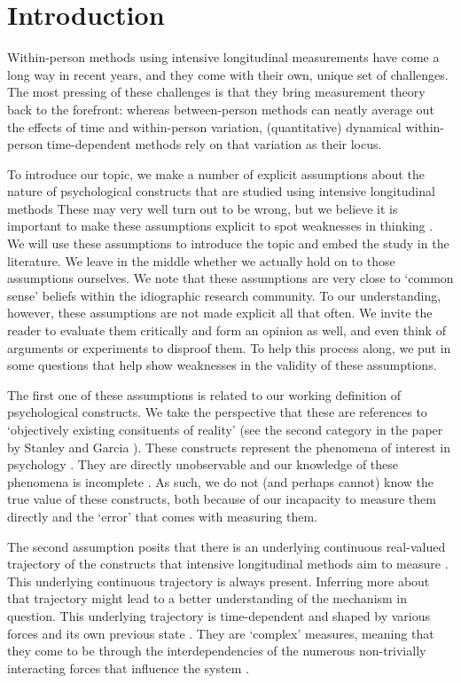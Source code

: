 \documentclass[utf8]{FrontiersinVancouver}
\begin{document}
\section{Introduction}

Within-person methods using intensive longitudinal measurements have come a long way in recent years, and they come with their own, unique set of challenges. The most pressing of these challenges is that they bring measurement theory back to the forefront: whereas between-person methods can neatly average out the effects of time and within-person variation, (quantitative) dynamical within-person time-dependent methods rely on that variation as their locus. 

To introduce our topic, we make a number of explicit assumptions about the nature of psychological constructs that are studied using intensive longitudinal methods These may very well turn out to be wrong, but we believe it is important to make these assumptions explicit to spot weaknesses in thinking \citep{meehlTheoreticalRisksTabular2004}. We will use these assumptions to introduce the topic and embed the study in the literature. We leave in the middle whether we actually hold on to those assumptions ourselves. We note that these assumptions are very close to `common sense' beliefs within the idiographic research community. To our understanding, however, these assumptions are not made explicit all that often. We invite the reader to evaluate them critically and form an opinion as well, and even think of arguments or experiments to disproof them. To help this process along, we put in some questions that help show weaknesses in the validity of these assumptions. 

The first one of these assumptions is related to our working definition of psychological constructs. We take the perspective that these are references to `objectively existing consituents of reality' (see the second category in the paper by Stanley and Garcia \citep{slaneyConstructingPsychologicalObjects2015}). These constructs represent the phenomena of interest in psychology \citep{borsboomLatentVariableTheory2008}. They are directly unobservable and our knowledge of these phenomena is incomplete \citep{friedWhatArePsychological2017, maraunAugustinianMethodologicalFamily2009}. As such, we do not (and perhaps cannot) know the true value of these constructs, both because of our incapacity to measure them directly and the `error' that comes with measuring them. 

The second assumption posits that there is an underlying continuous real-valued trajectory of the constructs that intensive longitudinal methods aim to measure \citep{hamakerNoTimePresent2017}. This underlying continuous trajectory is always present. Inferring more about that trajectory might lead to a better understanding of the mechanism in question. This underlying trajectory is time-dependent and shaped by various forces and its own previous state \citep{olthofComplexityPsychologicalSelfratings2020b}. They are `complex' measures, meaning that they come to be through the interdependencies of the numerous non-trivially interacting forces that influence the system \citep{olthofComplexityTheoryPsychopathology2023}. 
\end{document}
